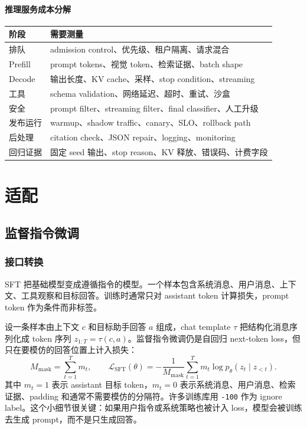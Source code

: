 \documentclass[UTF8,zihao=-4,openany]{ctexbook}
\begin{document}
\subsection{推理服务成本分解}
\begin{center}
\begin{tabular}{p{}p{}}
\toprule
阶段 & 需要测量 \\
\midrule
排队 & admission control、优先级、租户隔离、请求混合 \\
Prefill & prompt tokens、视觉 token、检索证据、batch shape \\
Decode & 输出长度、KV cache、采样、stop condition、streaming \\
工具 & schema validation、网络延迟、超时、重试、沙盒 \\
安全 & prompt filter、streaming filter、final classifier、人工升级 \\
发布运行 & warmup、shadow traffic、canary、SLO、rollback path \\
后处理 & citation check、JSON repair、logging、monitoring \\
\addlinespace
回归证据 & 固定 seed 输出、stop reason、KV 释放、错误码、计费字段 \\
\bottomrule
\end{tabular}
\end{center}

\part{适配}

\chapter{监督指令微调}
\section{接口转换}
SFT 把基础模型变成遵循指令的模型。一个样本包含系统消息、用户消息、上下文、工具观察和目标回答。训练时通常只对 assistant token 计算损失，prompt token 作为条件而非标签。

设一条样本由上下文 $c$ 和目标助手回答 $a$ 组成，chat template $\tau$ 把结构化消息序列化成 token 序列 $z_{1:T}=\tau(c,a)$。监督指令微调仍是自回归 next-token loss，但只在要模仿的回答位置上计入损失：
\[
  M_{\mathrm{mask}}=\sum_{t=1}^{T}m_t,\qquad
  \mathcal{L}_{\mathrm{SFT}}(\theta)
  =-\frac{1}{M_{\mathrm{mask}}}\sum_{t=1}^{T}
  m_t\log p_\theta(z_t\mid z_{<t}).
\]
其中 $m_t=1$ 表示 assistant 目标 token，$m_t=0$ 表示系统消息、用户消息、检索证据、padding 和通常不需要模仿的分隔符。许多训练库用 \texttt{-100} 作为 ignore label。这个小细节很关键：如果用户指令或系统策略也被计入 loss，模型会被训练去生成 prompt，而不是只生成回答。
\end{document}
